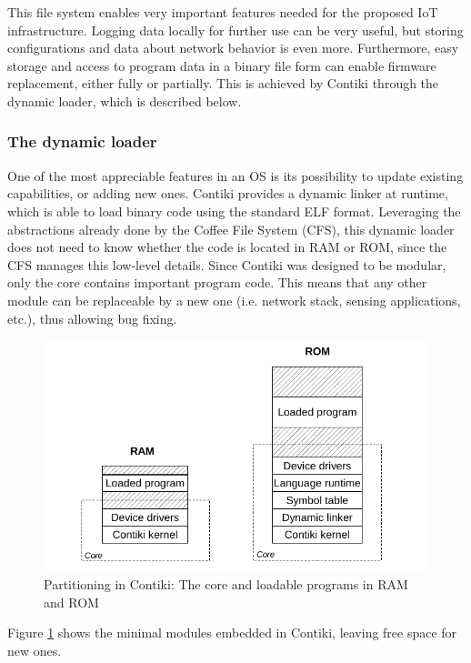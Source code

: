 This file system enables very important features needed for the proposed IoT infrastructure.
Logging data locally for further use can be very useful, but storing configurations and data about network behavior is even more.
Furthermore, easy storage and access to program data in a binary file form can enable firmware replacement, either fully or partially.
This is achieved by Contiki through the dynamic loader, which is described below.

\subsubsection{The dynamic loader}
One of the most appreciable features in an OS is its possibility to update existing capabilities, or adding new ones.
Contiki provides a dynamic linker at runtime, which is able to load binary code using the standard ELF format\cite{tis1995tool}.
Leveraging the abstractions already done by the Coffee File System (CFS), this dynamic loader does not need to know whether the code is located in RAM or ROM, since the CFS manages this low-level details.
Since Contiki was designed to be modular, only the core contains important program code.
This means that any other module can be replaceable by a new one (i.e. network stack, sensing applications, etc.), thus allowing bug fixing.

\begin{figure}[htb]
	\centering
	\includegraphics[width=1\columnwidth]{chapters/background.images/ContikiModules.pdf}
	\caption{Partitioning in Contiki: The core and loadable programs in RAM and ROM\cite{dunkels06runtime}}
	\label{fig:ContikiModules}
\end{figure}

Figure \ref{fig:ContikiModules} shows the minimal modules embedded in Contiki, leaving free space for new ones.


